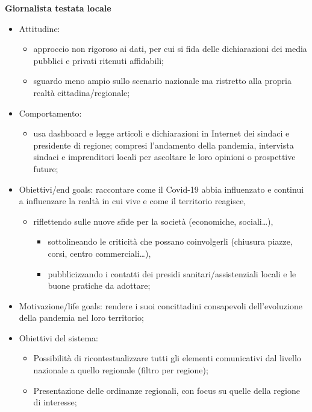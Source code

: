 \textbf{Giornalista testata locale}
\begin{itemize}
    \item Attitudine:
    \begin{itemize}
        \item approccio non rigoroso ai dati, per cui si fida delle dichiarazioni dei media pubblici e privati ritenuti affidabili;
        \item sguardo meno ampio sullo scenario nazionale ma ristretto alla propria realtà cittadina/regionale;
    \end{itemize}
	\item Comportamento: 
	\begin{itemize}
	    \item usa dashboard e legge articoli e dichiarazioni in Internet dei sindaci e presidente di regione;
		compresi l'andamento della pandemia, intervista sindaci e imprenditori locali per ascoltare le loro opinioni o prospettive future;
    \end{itemize}
	\item Obiettivi/end goals: raccontare come il Covid-19 abbia influenzato e continui a influenzare la realtà in cui vive e come il territorio reagisce,
	\begin{itemize}
        \item riflettendo sulle nuove sfide per la società (economiche, sociali…),
        \begin{itemize}
            \item sottolineando le criticità che possano coinvolgerli (chiusura piazze, corsi, centro commerciali…),
            \item pubblicizzando i contatti dei presidi sanitari/assistenziali locali e le buone pratiche da adottare;
        \end{itemize}
    \end{itemize}
	\item Motivazione/life goals: rendere i suoi concittadini consapevoli dell'evoluzione della pandemia nel loro territorio;
	\item Obiettivi del sistema:
    \begin{itemize}
        \item Possibilità di ricontestualizzare tutti gli elementi comunicativi dal livello nazionale a quello regionale (filtro per regione);
        \item Presentazione delle ordinanze regionali, con focus su quelle della regione di interesse;
    \end{itemize}
\end{itemize}

